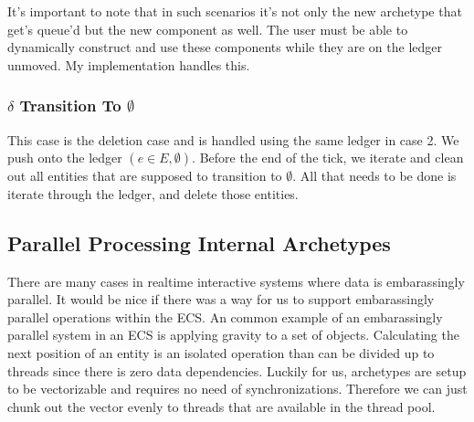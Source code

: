 It's important to note that in such scenarios it's not only the new archetype that get's queue'd but the new component as well. The user must be able to dynamically construct and use these components while they are on the ledger unmoved. My implementation handles this.

\subsubsection{$\delta$ Transition To $\emptyset$}
This case is the deletion case and is handled using the same ledger in case 2. We push onto the ledger $(e \in E, \emptyset)$. Before the end of the tick, we iterate and clean out all entities that are supposed to transition to $\emptyset$. All that needs to be done is iterate through the ledger, and delete those entities. 

\subsection{Parallel Processing Internal Archetypes}
There are many cases in realtime interactive systems where data is embarassingly parallel. It would be nice if there was a way for us to support embarassingly parallel operations within the ECS. An common example of an embarassingly parallel system in an ECS is applying gravity to a set of objects. Calculating the next position of an entity is an isolated operation than can be divided up to threads since there is zero data dependencies. Luckily for us, archetypes are setup to be vectorizable and requires no need of synchronizations. Therefore we can just chunk out the vector evenly to threads that are available in the thread pool.
